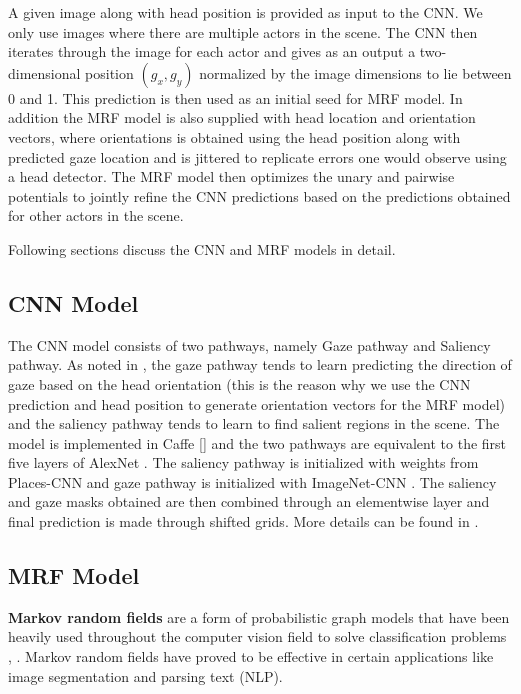 \documentclass[10pt,twocolumn,letterpaper]{article}
\begin{document}
A given image along with head position is provided as input to the CNN. We only use images where there are multiple actors in the scene. The CNN then iterates through the image for each actor and gives as an output a two-dimensional position $(g_x, g_y)$ normalized by the image dimensions to lie between 0 and 1. This prediction is then used as an initial seed for MRF model. In addition the MRF model is also supplied with head location and orientation vectors, where orientations is obtained using the head position along with predicted gaze location and is jittered to replicate errors one would observe using a head detector. The MRF model then optimizes the unary and pairwise potentials to jointly refine the CNN predictions based on the predictions obtained for other actors in the scene.

Following sections discuss the CNN and MRF models in detail.

\subsection{CNN Model}

The CNN model consists of two pathways, namely Gaze pathway and Saliency pathway. As noted in \cite{nips15_recasens}, the gaze pathway tends to learn predicting the direction of gaze based on the head orientation (this is the reason why we use the CNN prediction and head position to generate orientation vectors for the MRF model) and the saliency pathway tends to learn to find salient regions in the scene. The model is implemented in Caffe [] and the two pathways are equivalent to the first five layers of AlexNet \cite{krizhevsky2012imagenet}. The saliency pathway is initialized with weights from Places-CNN \cite{zhou2014learning} and gaze pathway is initialized with ImageNet-CNN \cite{russakovsky2015imagenet}.
The saliency and gaze masks obtained are then combined through an elementwise layer and final prediction is made through shifted grids. More details can be found in \cite{nips15_recasens}.

\subsection{MRF Model}

\textbf{Markov random fields} are a form of probabilistic graph models that have been heavily used throughout the computer vision field to solve classification problems \cite{wang2013markov}, \cite{quattoni2007hidden}. Markov random fields have proved to be effective in certain applications like image segmentation and parsing text (NLP).
\end{document}
